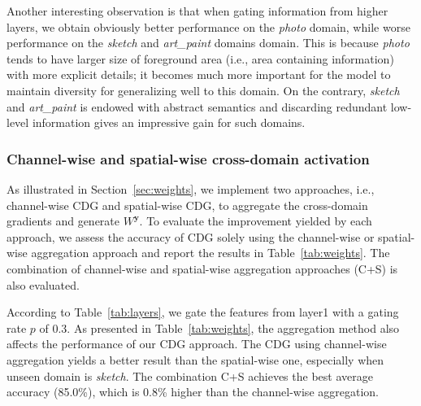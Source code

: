 Another interesting observation is that when gating information from higher layers, we obtain obviously better performance on the \textit{photo} domain, while worse performance on the \textit{sketch} and \textit{art\_paint} domains domain. This is because \textit{photo} tends to have larger size of foreground area (i.e., area containing information) with more explicit details; it becomes much more important for the model to maintain diversity for generalizing well to this domain. On the contrary, \textit{sketch} and \textit{art\_paint} is endowed with abstract semantics and discarding redundant low-level information gives an impressive gain for such domains.


\subsubsection{Channel-wise and spatial-wise cross-domain activation}
As illustrated in Section~\ref{sec:weights}, we implement two approaches, i.e., channel-wise CDG and spatial-wise CDG, to aggregate the cross-domain gradients and generate $W^\mathbf{y}$. To evaluate the improvement yielded by each approach, we assess the accuracy of CDG solely using the channel-wise or spatial-wise aggregation approach and report the results in Table~\ref{tab:weights}. The combination of channel-wise and spatial-wise aggregation approaches (C+S)  is also evaluated.
 
According to Table~\ref{tab:layers}, we gate the features from layer1 with a gating rate $p$ of 0.3. As presented in Table~\ref{tab:weights}, the aggregation method also affects the performance of our CDG approach. The CDG using channel-wise aggregation yields a better result than the spatial-wise one, especially when unseen domain is \textit{sketch}. The combination C+S achieves the best average accuracy (85.0\%), which is 0.8\% higher than the channel-wise aggregation.

